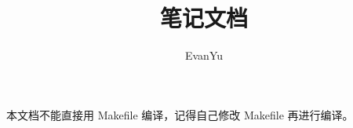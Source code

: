 \documentclass[12pt, openany]{book}
\title{\XeLaTeX{}笔记文档}
\author{EvanYu}
\date{}
\begin{document}
\maketitle{}
\tableofcontents{}

本文档不能直接用 Makefile 编译，记得自己修改 Makefile 再进行编译。
\end{document}
